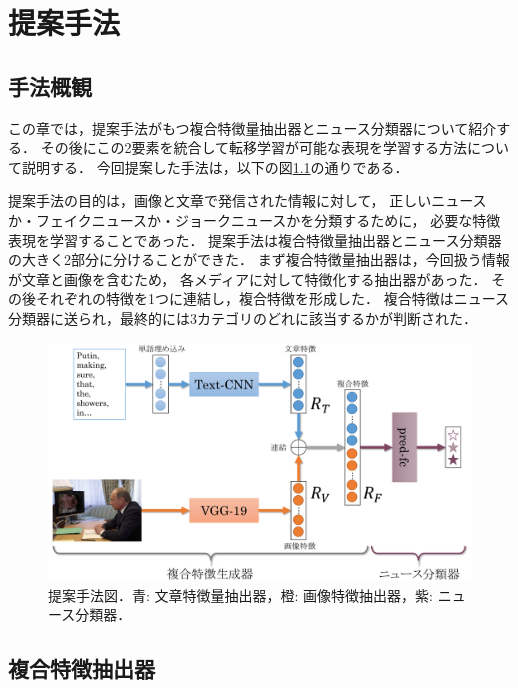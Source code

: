 %
\chapter{提案手法}\label{ch:methodology}
%
\section{手法概観}
この章では，提案手法がもつ複合特徴量抽出器とニュース分類器について紹介する．
その後にこの2要素を統合して転移学習が可能な表現を学習する方法について説明する．
今回提案した手法は，以下の図\ref{fig:model}の通りである．

提案手法の目的は，画像と文章で発信された情報に対して，
正しいニュースか・フェイクニュースか・ジョークニュースかを分類するために，
必要な特徴表現を学習することであった．
提案手法は複合特徴量抽出器とニュース分類器の大きく2部分に分けることができた．
まず複合特徴量抽出器は，今回扱う情報が文章と画像を含むため，
各メディアに対して特徴化する抽出器があった．
その後それぞれの特徴を1つに連結し，複合特徴を形成した．
複合特徴はニュース分類器に送られ，最終的には3カテゴリのどれに該当するかが判断された．
% 
\begin{figure}[H]
    \centering
    \includegraphics[width=\linewidth]{images/methodology.pdf}
    \caption{提案手法図．青: 文章特徴量抽出器，橙: 画像特徴抽出器，紫: ニュース分類器．}
    \label{fig:model}
\end{figure}
%
\section{複合特徴抽出器}
%
